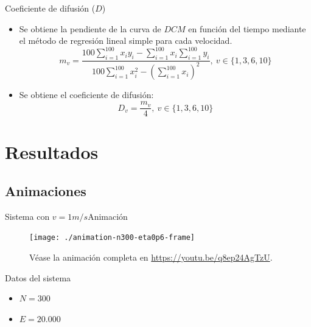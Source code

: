 \documentclass{beamer}
\begin{document}
            \begin{frame}{Coeficiente de difusión ($D$)}
                \begin{itemize}
                    \item Se obtiene la pendiente de la curva de $DCM$ en función del tiempo mediante el método
                    de regresión lineal simple para cada velocidad.
                    \begin{equation*}
                        m_v = \frac{100 \sum_{i=1}^{100} x_i y_i - \sum_{i=1}^{100} x_i \sum_{i=1}^{100} y_i }{100 \sum_{i=1}^{100} x_i^2
                        - \left(\sum_{i=1}^{100} x_i \right)^2},\ v \in \{1, 3, 6, 10\}
                    \end{equation*}
                    \item Se obtiene el coeficiente de difusión:
                    \begin{equation*}
                        D_v = \frac{m_v}{4},\ v \in \{1, 3, 6, 10\}
                    \end{equation*}
                \end{itemize}
            \end{frame}


    \section{Resultados}

        \subsection{Animaciones}

            \begin{frame}{Sistema con $v=1m/s$}{Animación}
                \begin{minipage}[t]{0.60\textwidth}
                    \begin{figure}[H!]
                        \texttt{[image: ./animation-n300-eta0p6-frame]}
                        \caption*{Véase la animación completa en \url{https://youtu.be/q8ep24AgTzU}.}
                        \label{fig:a_1}
                    \end{figure}
                \end{minipage}
                \hfill
                \begin{minipage}[t]{0.30\textwidth}
                    \begin{block}{Datos del sistema}
                        \begin{itemize}
                            \item $N=300$
                            \item $E=20.000$
                        \end{itemize}
                    \end{block}
                \end{minipage}
            \end{frame}
\end{document}

